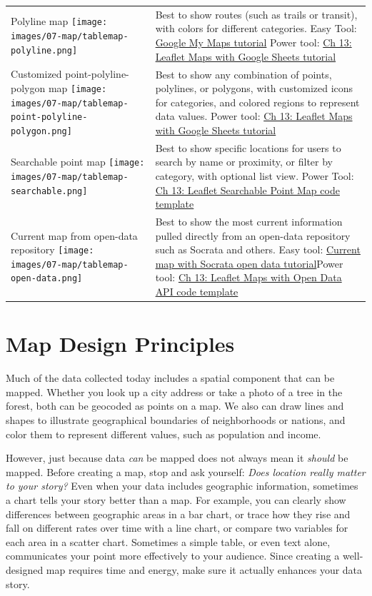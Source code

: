 \documentclass[
  english,
]{book}
\begin{document}
\begin{longtable}[]{@{}
  >{\raggedright\arraybackslash}p{}
  >{\raggedright\arraybackslash}p{}@{}}
Polyline map \texttt{[image: images/07-map/tablemap-polyline.png]} & Best to show routes (such as trails or transit), with colors for different categories. Easy Tool: \href{mymaps.html}{Google My Maps tutorial} Power tool: \href{leaflet-maps-with-google-sheets.html}{Ch 13: Leaflet Maps with Google Sheets tutorial} \\
Customized point-polyline-polygon map \texttt{[image: images/07-map/tablemap-point-polyline-polygon.png]} & Best to show any combination of points, polylines, or polygons, with customized icons for categories, and colored regions to represent data values. Power tool: \href{leaflet-maps-with-google-sheets.html}{Ch 13: Leaflet Maps with Google Sheets tutorial} \\
Searchable point map \texttt{[image: images/07-map/tablemap-searchable.png]} & Best to show specific locations for users to search by name or proximity, or filter by category, with optional list view. Power Tool: \href{leaflet-searchable-map.html}{Ch 13: Leaflet Searchable Point Map code template} \\
Current map from open-data repository \texttt{[image: images/07-map/tablemap-open-data.png]} & Best to show the most current information pulled directly from an open-data repository such as Socrata and others. Easy tool: \href{map-socrata.html}{Current map with Socrata open data tutorial}Power tool: \href{leaflet-maps-open-data-apis.html}{Ch 13: Leaflet Maps with Open Data API code template} \\
\bottomrule
\end{longtable}

\hypertarget{map-design}{%
\section*{Map Design Principles}\label{map-design}}

Much of the data collected today includes a spatial component that can be mapped. Whether you look up a city address or take a photo of a tree in the forest, both can be geocoded as points on a map. We also can draw lines and shapes to illustrate geographical boundaries of neighborhoods or nations, and color them to represent different values, such as population and income.

However, just because data \emph{can} be mapped does not always mean it \emph{should} be mapped. Before creating a map, stop and ask yourself: \emph{Does location really matter to your story?} Even when your data includes geographic information, sometimes a chart tells your story better than a map. For example, you can clearly show differences between geographic areas in a bar chart, or trace how they rise and fall on different rates over time with a line chart, or compare two variables for each area in a scatter chart. Sometimes a simple table, or even text alone, communicates your point more effectively to your audience. Since creating a well-designed map requires time and energy, make sure it actually enhances your data story.
\end{document}
